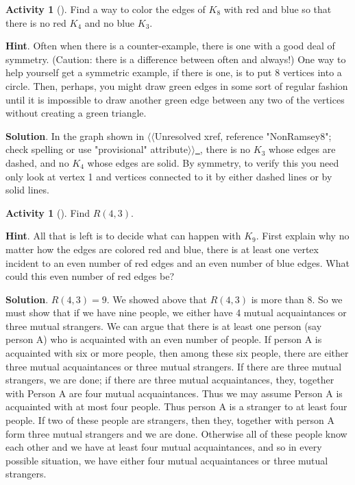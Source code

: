 \documentclass[10pt,]{book}
\theoremstyle{plain}
\theoremstyle{definition}
\theoremstyle{definition}
\theoremstyle{definition}
\newtheorem{activity}[project]{Activity}
\numberwithin{equation}{chapter}
\begin{document}
\begin{activity}[]\label{activity-43}
\hypertarget{p-414}{}%
Find a way to color the edges of \(K_8\) with red and blue so that there is no red \(K_4\) and no blue \(K_3\).%
\par\smallskip%
\noindent\textbf{Hint}.\hypertarget{hint-20}{}\quad%
\hypertarget{p-415}{}%
Often when there is a counter-example, there is one with a good deal of symmetry. (Caution: there is a difference between often and always!) One way to help yourself get a symmetric example, if there is one, is to put 8 vertices into a circle. Then, perhaps, you might draw green edges in some sort of regular fashion until it is impossible to draw another green edge between any two of the vertices without creating a green triangle.%
\par\smallskip%
\noindent\textbf{Solution}.\hypertarget{solution-30}{}\quad%
\hypertarget{p-416}{}%
In the graph shown in {$\langle\langle$Unresolved xref, reference "NonRamsey8"; check spelling or use "provisional" attribute$\rangle\rangle$}\hyperlink{}{~}, there is no \(K_3\) whose edges are dashed, and no \(K_4\) whose edges are solid. By symmetry, to verify this you need only look at vertex 1 and vertices connected to it by either dashed lines or by solid lines.%
\end{activity}
\begin{activity}[]\label{activity-44}
\hypertarget{p-417}{}%
Find \(R(4,3)\).%
\par\smallskip%
\noindent\textbf{Hint}.\hypertarget{hint-21}{}\quad%
\hypertarget{p-418}{}%
All that is left is to decide what can happen with \(K_9\).  First explain why no matter how the edges are colored red and blue, there is at least one vertex incident to an even number of red edges and an even number of blue edges.  What could this even number of red edges be?%
\par\smallskip%
\noindent\textbf{Solution}.\hypertarget{solution-31}{}\quad%
\hypertarget{p-419}{}%
\(R(4,3)=9\). We showed above that \(R(4,3)\) is more than 8. So we must show that if we have nine people, we either have 4 mutual acquaintances or three mutual strangers. We can argue that there is at least one person (say person A) who is acquainted with an even number of people. If person A is acquainted with six or more people, then among these six people, there are either three mutual acquaintances or three mutual strangers. If there are three mutual strangers, we are done; if there are three mutual acquaintances, they, together with Person A are four mutual acquaintances. Thus we may assume Person A is acquainted with at most four people. Thus person A is a stranger to at least four people. If two of these people are strangers, then they, together with person A form three mutual strangers and we are done. Otherwise all of these people know each other and we have at least four mutual acquaintances, and so in every possible situation, we have either four mutual acquaintances or three mutual strangers.%
\end{activity}
\end{document}
